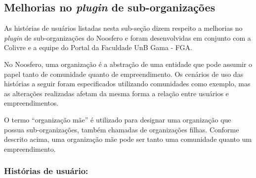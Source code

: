 \subsection{Melhorias no \textit{plugin} de sub-organizações}

As histórias de usuários listadas nesta sub-seção dizem respeito a melhorias
no \textit{plugin} de sub-organizações do Noosfero e foram desenvolvidas em
conjunto com a Colivre e a equipe do Portal da Faculdade UnB Gama - FGA.

No Noosfero, uma organização é a abstração de uma entidade que pode assumir
o papel tanto de comunidade quanto de empreendimento. Os cenários de uso das
histórias a seguir foram especificados utilizando comunidades como exemplo,
mas as alterações realizadas afetam da mesma forma a relação entre usuários
e empreendimentos.


O termo ``organização mãe'' é utilizado para designar uma organização que
possua sub-organizações, também chamadas de organizações filhas. Conforme
descrito acima, uma organização mãe pode ser tanto uma comunidade quanto um
empreendimento.

\subsubsection*{Histórias de usuário:}

